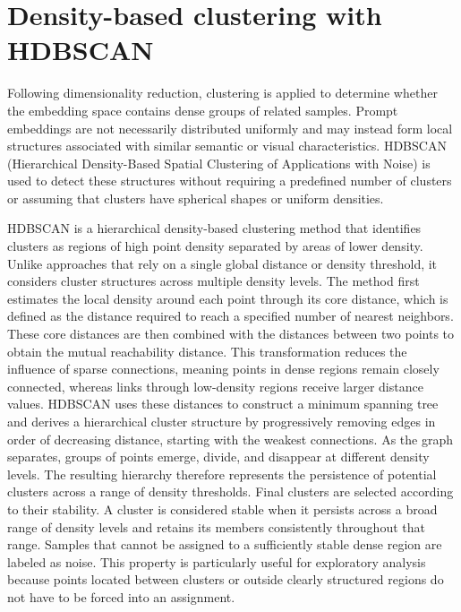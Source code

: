 \FloatBarrier

\section{Density-based clustering with HDBSCAN}\label{sec:2.5}

Following dimensionality reduction, clustering is applied to determine whether the embedding space contains dense groups of related samples. Prompt embeddings are not necessarily distributed uniformly and may instead form local structures associated with similar semantic or visual characteristics. HDBSCAN (Hierarchical Density-Based Spatial Clustering of Applications with Noise) is used to detect these structures without requiring a predefined number of clusters or assuming that clusters have spherical shapes or uniform densities.

HDBSCAN is a hierarchical density-based clustering method that identifies clusters as regions of high point density separated by areas of lower density. Unlike approaches that rely on a single global distance or density threshold, it considers cluster structures across multiple density levels. The method first estimates the local density around each point through its core distance, which is defined as the distance required to reach a specified number of nearest neighbors. These core distances are then combined with the distances between two points to obtain the mutual reachability distance. This transformation reduces the influence of sparse connections, meaning points in dense regions remain closely connected, whereas links through low-density regions receive larger distance values.
HDBSCAN uses these distances to construct a minimum spanning tree and derives a hierarchical cluster structure by progressively removing edges in order of decreasing distance, starting with the weakest connections. As the graph separates, groups of points emerge, divide, and disappear at different density levels. The resulting hierarchy therefore represents the persistence of potential clusters across a range of density thresholds.
Final clusters are selected according to their stability. A cluster is considered stable when it persists across a broad range of density levels and retains its members consistently throughout that range. Samples that cannot be assigned to a sufficiently stable dense region are labeled as noise. This property is particularly useful for exploratory analysis because points located between clusters or outside clearly structured regions do not have to be forced into an assignment.
\cite{campello2015hdbscan}

